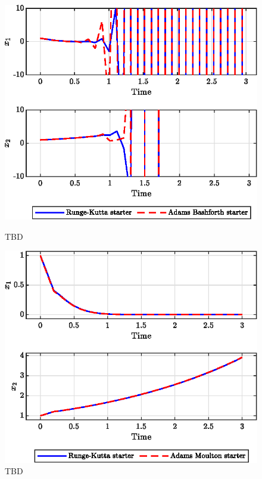 \documentclass[11pt,a4paper,oneside]{article}
\begin{document}
\begin{figure}[htb]
    \centering
    \begin{minipage}{0.45\textwidth}
        \centering
        \includegraphics*[width=\textwidth, keepaspectratio]{ex7_ab.eps}
        \caption[]{\label{fig:ex7_ab} TBD}
    \end{minipage}
    \hspace{0.05\textwidth}
    \begin{minipage}{0.45\textwidth}
        \centering
        \includegraphics*[width=\textwidth, keepaspectratio]{ex7_am.eps}
        \caption[]{\label{fig:ex7_am} TBD}
    \end{minipage}
\end{figure}
\end{document}
